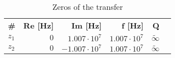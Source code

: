 \begin{table}[H]
\centering
\begin{tabular}[c]{lrrrrr}
\textbf{\#} & \textbf{Re [Hz]} & \textbf{Im [Hz]} & \textbf{f [Hz]} & \textbf{Q} \\ 
\rowcolor{myyellow}
$z_{\mathrm{1}}$ &$0$ &$1.007 \cdot 10^{7}$ &$1.007 \cdot 10^{7}$ &$\tilde{\infty}$ \\ 
$z_{\mathrm{2}}$ &$0$ &$-1.007 \cdot 10^{7}$ &$1.007 \cdot 10^{7}$ &$\tilde{\infty}$ \\ 
\end{tabular}
\caption{Zeros of the transfer}
\label{tab-zeros}
\end{table}

